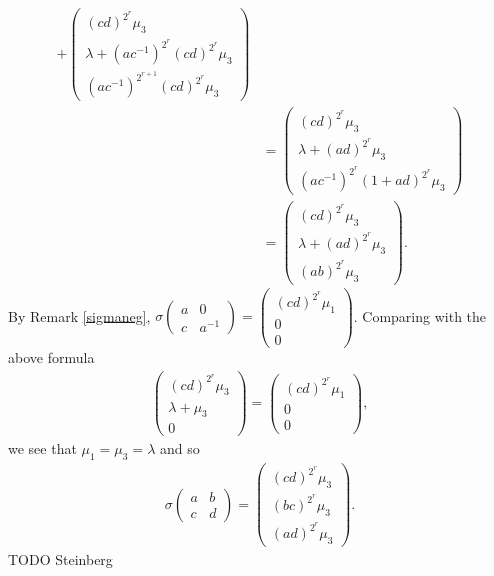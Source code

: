\begin{align*}
	+ 
	\left(\begin{matrix} (cd)^{2^r}\mu_3 \\ \lambda + (ac^{-1})^{2^r} (cd)^{2^r}\mu_3 \\  (ac^{-1})^{2^{r+1}} (cd)^{2^r}\mu_3 \end{matrix}\right)\\
	&=
\left(\begin{matrix} (cd)^{2^r}\mu_3 \\ \lambda + (ad)^{2^r}\mu_3 \\ (ac^{-1})^{2^r}(1 + ad)^{2^r}\mu_3 \end{matrix}\right) \\
	&=\left(\begin{matrix} (cd)^{2^r}\mu_3 \\ \lambda + (ad)^{2^r}\mu_3 \\ (ab)^{2^r}\mu_3 \end{matrix}\right).
	\end{align*}
By Remark \ref{sigmaneg}, $\sigma\left(\begin{matrix}a & 0\\c & a^{-1}\end{matrix}\right) = \left(\begin{matrix}(cd)^{2^r}\mu_1\\0\\0\end{matrix}\right)$. Comparing with the above formula
\begin{align*}
\left(\begin{matrix} (cd)^{2^r}\mu_3 \\ \lambda + \mu_3 \\ 0 \end{matrix}\right)
=
\left(\begin{matrix} (cd)^{2^r}\mu_1 \\ 0 \\ 0 \end{matrix}\right),
\end{align*}
we see that $\mu_1=\mu_3=\lambda$ and so 
\begin{align*}
\sigma\left(\begin{matrix}a & b \\ c & d\end{matrix}\right) = \left(\begin{matrix} (cd)^{2^r}\mu_3 \\ (bc)^{2^r}\mu_3 \\ (ad)^{2^r}\mu_3\end{matrix}\right).
\end{align*}
TODO Steinberg

